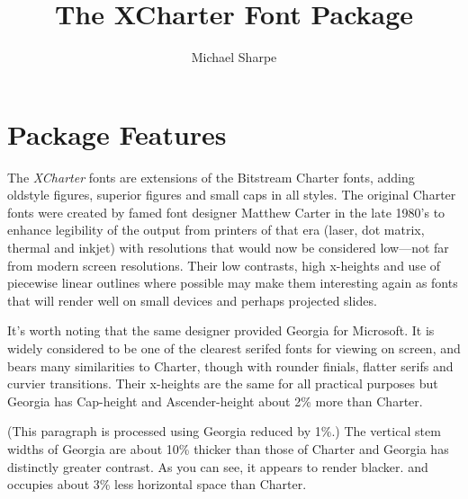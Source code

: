 \documentclass[11pt]{article}
\title{The XCharter Font Package}
\author{Michael Sharpe}
\begin{document}
\maketitle
\section{Package Features}
The \emph{XCharter} fonts are extensions of the Bitstream Charter fonts, adding oldstyle figures, superior figures and small caps in all styles. The original Charter fonts were created by famed font designer Matthew Carter in the late 1980's to enhance legibility of the output from printers of that era (laser, dot matrix, thermal and inkjet) with resolutions that would now be considered low---not far from modern screen resolutions. Their low contrasts, high x-heights and use of piecewise linear outlines where possible may make them interesting again as fonts that will render well on small devices and perhaps projected slides. 

It's worth noting that the same designer provided Georgia for Microsoft. It is widely considered to be one of the clearest serifed fonts for viewing on screen, and bears many similarities to Charter, though with rounder finials, flatter serifs and curvier transitions. Their x-heights are the same for all practical purposes but Georgia has Cap-height and Ascender-height about 2\% more than Charter. 

{\georgia (This paragraph is processed  using Georgia reduced by 1\%.) The vertical stem widths of Georgia are about 10\% thicker than those of Charter and Georgia has distinctly greater contrast. As you can see, it appears to render blacker. and occupies about 3\% less horizontal space than Charter.}
 
\end{document}
